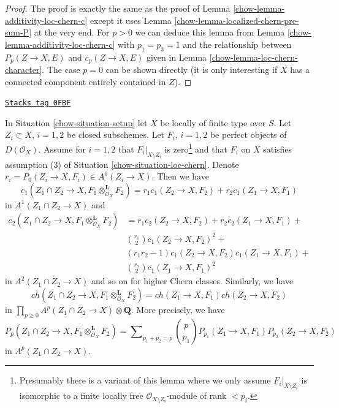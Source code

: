 \begin{proof}

The proof is exactly the same as the proof of
Lemma \ref{chow-lemma-additivity-loc-chern-c}
except it uses
Lemma \ref{chow-lemma-localized-chern-pre-sum-P}
at the very end. For $p > 0$ we can deduce this lemma
from Lemma \ref{chow-lemma-additivity-loc-chern-c} with $p_1 = p_3 = 1$
and the relationship between $P_p(Z \to X, E)$ and $c_p(Z \to X, E)$ given in
Lemma \ref{chow-lemma-loc-chern-character}. The case $p = 0$ can be shown
directly (it is only interesting if $X$ has a connected component
entirely contained in $Z$).
\end{proof}

\begin{lemma}
\label{chow-lemma-loc-chern-tensor-product}
\href{https://stacks.math.columbia.edu/tag/0FBF}{\texttt{Stacks tag 0FBF}}

In Situation \ref{chow-situation-setup} let $X$ be locally of finite type over $S$.
Let $Z_i \subset X$, $i = 1, 2$ be closed subschemes. Let $F_i$, $i = 1, 2$
be perfect objects of $D(\mathcal{O}_X)$. Assume for $i = 1, 2$ that
$F_i|_{X \setminus Z_i}$ is zero\footnote{Presumably there
is a variant of this lemma where we only assume $F_i|_{X \setminus Z_i}$
is isomorphic to a finite locally free $\mathcal{O}_{X \setminus Z_i}$-module
of rank $< p_i$.} and that $F_i$ on $X$ satisfies assumption
(3) of Situation \ref{chow-situation-loc-chern}. Denote
$r_i = P_0(Z_i \to X, F_i) \in A^0(Z_i \to X)$.
Then we have
$$
c_1(Z_1 \cap Z_2 \to X, F_1 \otimes_{\mathcal{O}_X}^\mathbf{L} F_2) =
r_1 c_1(Z_2 \to X, F_2) + r_2 c_1(Z_1 \to X, F_1)
$$
in $A^1(Z_1 \cap Z_2 \to X)$ and
\begin{align*}
c_2(Z_1 \cap Z_2 \to X, F_1 \otimes_{\mathcal{O}_X}^\mathbf{L} F_2)
& =
r_1 c_2(Z_2 \to X, F_2) +
r_2 c_2(Z_1 \to X, F_1) + \\
& {r_1 \choose 2} c_1(Z_2 \to X, F_2)^2 + \\
& (r_1r_2 - 1) c_1(Z_2 \to X, F_2)c_1(Z_1 \to X, F_1) + \\
& {r_2 \choose 2} c_1(Z_1 \to X, F_1)^2
\end{align*}
in $A^2(Z_1 \cap Z_2 \to X)$ and so on for higher Chern classes.
Similarly, we have
$$
ch(Z_1 \cap Z_2 \to X, F_1 \otimes_{\mathcal{O}_X}^\mathbf{L} F_2) =
ch(Z_1 \to X, F_1) ch(Z_2 \to X, F_2)
$$
in $\prod_{p \geq 0} A^p(Z_1 \cap Z_2 \to X) \otimes \mathbf{Q}$.
More precisely, we have
$$
P_p(Z_1 \cap Z_2 \to X, F_1 \otimes_{\mathcal{O}_X}^\mathbf{L} F_2) =
\sum\nolimits_{p_1 + p_2 = p}
{p \choose p_1} P_{p_1}(Z_1 \to X, F_1) P_{p_2}(Z_2 \to X, F_2)
$$
in $A^p(Z_1 \cap Z_2 \to X)$.
\end{lemma}

